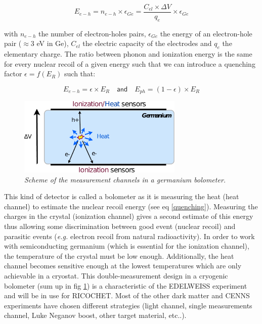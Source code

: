 \begin{equation}
E_{e-h} = n_{e-h} \times \epsilon_{Ge} = \frac{C_{el} \times \Delta V}{q_{e}} \times \epsilon_{Ge}
\end{equation}

with $n_{e-h}$ the number of electron-holes pairs, $\epsilon_{Ge}$ the energy of an electron-hole pair ($\approx 3$ eV in Ge), $C_{el}$ the electric capacity of the electrodes and $q_{e}$ the elementary charge. The ratio between phonon and ionization energy is the same for every nuclear recoil of a given energy such that we can introduce a quenching factor $\epsilon = f(E_R)$ such that:

\begin{equation}
\label{quenching}
E_{e-h} = \epsilon \times E_R \quad \textsf{and} \quad E_{ph} =(1-\epsilon) \times E_R
\end{equation}

\begin{figure}
\centering
\captionsetup{justification=centering}
\includegraphics[width=0.7\textwidth]{Figures/Experiment/ge_detector.pdf}
\caption{\label{ge-principle} \em Scheme of the measurement channels in a germanium bolometer.}
\end{figure}

This kind of detector is called a bolometer as it is measuring the heat (heat channel) to estimate the nuclear recoil energy (see eq \ref{quenching}). Measuring the charges in the crystal (ionization channel) gives a second estimate of this energy thus allowing some discrimination between good event (nuclear recoil) and parasitic events ({\em e.g.} electron recoil from natural radioactivity). In order to work with semiconducting germanium (which is essential for the ionization channel), the temperature of the crystal must be low enough. Additionally, the heat channel becomes sensitive enough at the lowest temperatures which are only achievable in a cryostat.
This double-measurement design in a cryogenic bolometer (sum up in fig \ref{ge-principle}) is a characteristic of the EDELWEISS experiment and will be in use for RICOCHET. Most of the other dark matter and CENNS experiments have chosen different strategies (light channel, single measurements channel, Luke Neganov boost, other target material, etc..).

